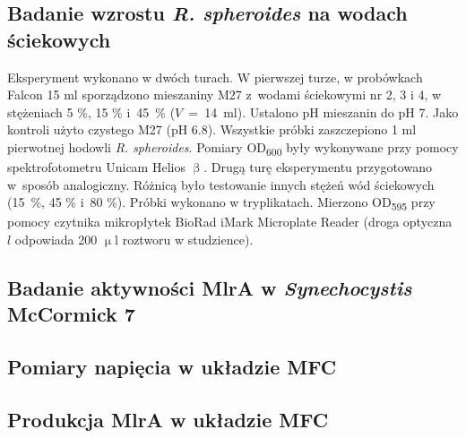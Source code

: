 \subsection{Badanie wzrostu \textit{R. spheroides} na wodach ściekowych}\label{subsec:rhodobacter}
Eksperyment wykonano w dwóch turach.
W pierwszej turze, w probówkach Falcon 15 ml sporządzono
mieszaniny M27 z~wodami ściekowymi nr 2, 3 i 4,
w stężeniach 5 \%, 15 \% i~45~\% ($V$~=~14~ml).
Ustalono pH mieszanin do pH 7.
Jako kontroli użyto czystego M27 (pH 6.8).
Wszystkie próbki zaszczepiono 1 ml pierwotnej hodowli
\textit{R. spheroides}.
Pomiary OD\textsubscript{600} były wykonywane przy pomocy
spektrofotometru Unicam Helios $\upbeta$.
Drugą turę eksperymentu przygotowano w~sposób analogiczny.
Różnicą było testowanie innych stężeń wód ściekowych
(15~\%, 45 \% i~80 \%).
Próbki wykonano w tryplikatach.
Mierzono OD\textsubscript{595} przy pomocy czytnika
mikropłytek BioRad iMark Microplate Reader
(droga optyczna $l$ odpowiada 200 $\upmu$l roztworu w studzience).

\subsection{Badanie aktywności MlrA w \textit{Synechocystis} McCormick 7}\label{subsec:mlra}

\subsection{Pomiary napięcia w układzie MFC}\label{subsec:volt}

\subsection{Produkcja MlrA w układzie MFC}\label{subsec:mfc}